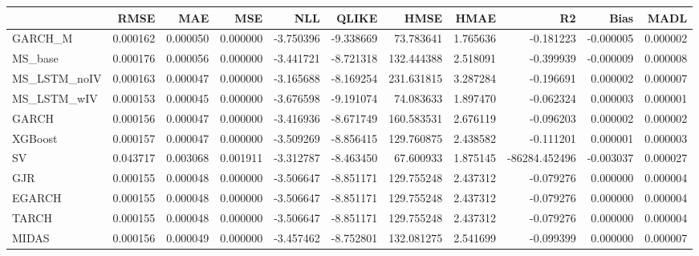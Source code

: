 \begin{tabular}{lrrrrrrrrrr}
\toprule
 & RMSE & MAE & MSE & NLL & QLIKE & HMSE & HMAE & R2 & Bias & MADL \\
\midrule
GARCH_M & 0.000162 & 0.000050 & 0.000000 & -3.750396 & -9.338669 & 73.783641 & 1.765636 & -0.181223 & -0.000005 & 0.000002 \\
MS_base & 0.000176 & 0.000056 & 0.000000 & -3.441721 & -8.721318 & 132.444388 & 2.518091 & -0.399939 & -0.000009 & 0.000008 \\
MS_LSTM_noIV & 0.000163 & 0.000047 & 0.000000 & -3.165688 & -8.169254 & 231.631815 & 3.287284 & -0.196691 & 0.000002 & 0.000007 \\
MS_LSTM_wIV & 0.000153 & 0.000045 & 0.000000 & -3.676598 & -9.191074 & 74.083633 & 1.897470 & -0.062324 & 0.000003 & 0.000001 \\
GARCH & 0.000156 & 0.000047 & 0.000000 & -3.416936 & -8.671749 & 160.583531 & 2.676119 & -0.096203 & 0.000002 & 0.000002 \\
XGBoost & 0.000157 & 0.000047 & 0.000000 & -3.509269 & -8.856415 & 129.760875 & 2.438582 & -0.111201 & 0.000001 & 0.000003 \\
SV & 0.043717 & 0.003068 & 0.001911 & -3.312787 & -8.463450 & 67.600933 & 1.875145 & -86284.452496 & -0.003037 & 0.000027 \\
GJR & 0.000155 & 0.000048 & 0.000000 & -3.506647 & -8.851171 & 129.755248 & 2.437312 & -0.079276 & 0.000000 & 0.000004 \\
EGARCH & 0.000155 & 0.000048 & 0.000000 & -3.506647 & -8.851171 & 129.755248 & 2.437312 & -0.079276 & 0.000000 & 0.000004 \\
TARCH & 0.000155 & 0.000048 & 0.000000 & -3.506647 & -8.851171 & 129.755248 & 2.437312 & -0.079276 & 0.000000 & 0.000004 \\
MIDAS & 0.000156 & 0.000049 & 0.000000 & -3.457462 & -8.752801 & 132.081275 & 2.541699 & -0.099399 & 0.000000 & 0.000007 \\
\bottomrule
\end{tabular}
